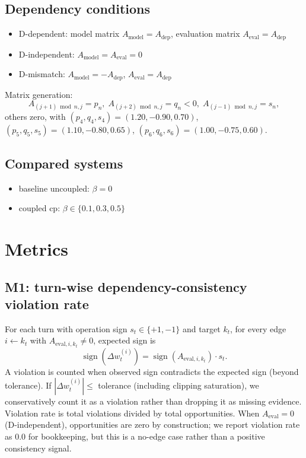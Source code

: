 \documentclass[11pt,a4paper]{article}
\begin{document}
\subsection{Dependency conditions}
\begin{itemize}
  \item D-dependent: model matrix \(A_{\text{model}}=A_{\text{dep}}\), evaluation matrix \(A_{\text{eval}}=A_{\text{dep}}\)
  \item D-independent: \(A_{\text{model}}=A_{\text{eval}}=0\)
  \item D-mismatch: \(A_{\text{model}}=-A_{\text{dep}}\), \(A_{\text{eval}}=A_{\text{dep}}\)
\end{itemize}

Matrix generation:
\[
A_{(j+1)\bmod n,j}=p_n,\;
A_{(j+2)\bmod n,j}=q_n<0,\;
A_{(j-1)\bmod n,j}=s_n,
\]
others zero, with
\((p_4,q_4,s_4)=(1.20,-0.90,0.70)\),
\((p_5,q_5,s_5)=(1.10,-0.80,0.65)\),
\((p_6,q_6,s_6)=(1.00,-0.75,0.60)\).

\subsection{Compared systems}
\begin{itemize}
  \item baseline uncoupled: \(\beta=0\)
  \item coupled cp: \(\beta\in\{0.1,0.3,0.5\}\)
\end{itemize}

\section{Metrics}
\subsection{M1: turn-wise dependency-consistency violation rate}
For each turn with operation sign \(s_t\in\{+1,-1\}\) and target \(k_t\), for every edge \(i\leftarrow k_t\) with \(A_{\text{eval},i,k_t}\neq 0\), expected sign is
\[
\operatorname{sign}(\Delta w_t^{(i)}) = \operatorname{sign}(A_{\text{eval},i,k_t})\cdot s_t.
\]
A violation is counted when observed sign contradicts the expected sign (beyond tolerance). If \(|\Delta w_t^{(i)}|\le\) tolerance (including clipping saturation), we conservatively count it as a violation rather than dropping it as missing evidence.
Violation rate is total violations divided by total opportunities.
When \(A_{\text{eval}}=0\) (D-independent), opportunities are zero by construction; we report violation rate as 0.0 for bookkeeping, but this is a no-edge case rather than a positive consistency signal.
\end{document}
